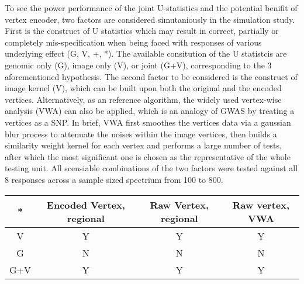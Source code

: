 \documentclass[twocolumn]{article}
\begin{document}
To see the power performance of the joint U-statistics and the potential benifit of vertex encoder, two factors are considered simutaniously in the simulation study. First is the construct of U statistics which may result in correct, partially or completely mis-specification when being faced with responses of various underlying effect (G, V, +, *). The available consitution of the U statistcis are genomic only (G), image only (V), or joint (G+V), corresponding to the 3 aforementioned hypothesis. The second factor to be considered is the construct of image kernel (V), which can be built upon both the original and the encoded vertices. Alternatively, as an reference algorithm, the widely used vertex-wise analysis (VWA) can also be applied, which is an analogy of GWAS by treating a vertices as a SNP. In brief, VWA first smoothes the vertices data via a gaussian blur process to attenuate the noises within the image vertices, then builds a similarity weight kernel for each vertex and performs a large number of tests, after which the most significant one is chosen as the representative of the whole testing unit. All scensiable combinations of the two factors were tested against all 8 responses across a sample sized spectrium from 100 to 800.

\begin{tabular}{|c|c|c|c|}
  \hline
  *   & Encoded Vertex, regional & Raw Vertex, regional & Raw vertex, VWA  \\ \hline
  V   & Y              & Y          & Y            \\ \hline
  G   & N              & N          & N            \\ \hline
  G+V & Y              & Y          & Y            \\ \hline
\end{tabular}
\end{document}
